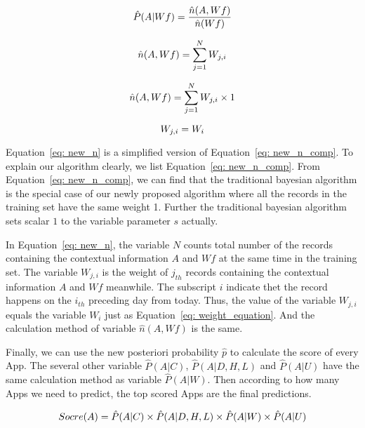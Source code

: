 \begin{equation}
\footnotesize
\label{eq: new_prob}
    {\hat P}(A|Wf)=\frac{{\hat n}(A,Wf)}{{\hat n}(Wf)}
\end{equation}


\begin{equation}
\footnotesize
\label{eq: new_n}
    {\hat n}(A,Wf)=\sum_{j=1}^{N} W_{j,i}
\end{equation}


\begin{equation}
\footnotesize
\label{eq: new_n_comp}
    {\hat n}(A,Wf)=\sum_{j=1}^{N} W_{j,i} \times 1
\end{equation}


\begin{equation}
\footnotesize
\label{eq: weight_equation}
    W_{j,i}=W_{i}
\end{equation}


Equation~\ref{eq: new_n} is a simplified version of Equation~\ref{eq: new_n_comp}. To explain our algorithm clearly, we list Equation~\ref{eq: new_n_comp}. From Equation~\ref{eq: new_n_comp}, we can find that the traditional bayesian algorithm is the special case of our newly proposed algorithm where all the records in the training set have the same weight 1. Further the traditional bayesian algorithm sets scalar $1$ to the variable parameter $s$ actually.


In Equation~\ref{eq: new_n}, the variable $N$ counts total number of the records containing the contextual information $A$ and $Wf$ at the same time in the training set. The variable $W_{j,i}$ is the weight of $j_{th}$ records containing the contextual information $A$ and $Wf$ meanwhile. The subscript $i$ indicate thet the record happens on the $i_{th}$ preceding day from today. Thus, the value of the variable $W_{j,i}$ equals the variable $W_{i}$ just as Equation~\ref{eq: weight_equation}. And the calculation method of variable ${\hat n}(A,Wf)$ is the same.


Finally, we can use the new posteriori probability ${\hat p}$ to calculate the score of every App. The several other variable ${\hat P}(A | C)$, ${\hat P}(A|D,H,L)$ and ${\hat P}(A|U)$ have the same calculation method as variable ${\hat P}(A|W)$. Then according to how many Apps we need to predict, the top scored Apps are the final predictions.


\begin{equation}
\footnotesize
\label{eq: score}
    Socre(A) = {\hat P}(A | C) \times {\hat P}(A|D,H,L) \times {\hat P}(A|W) \times {\hat P}(A|U)
\end{equation}